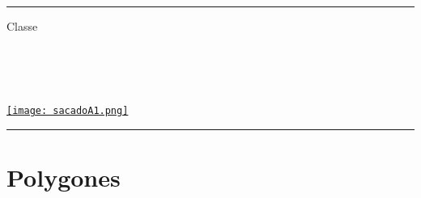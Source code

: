 \documentclass[a4paper,dvipsnames]{article}
\begin{document}

\fancyhead[C]{}
\hrule\medskip %
\begin{minipage}{0.295\textwidth} 
\raggedright
Classe \myClasse \hfill\\
\myDiscipline \hfill\\
\myParcours \hfill\\
\end{minipage}
\begin{minipage}{0.4\textwidth} 
\centering 
\scshape\huge
\textcolor{sacado_purple}{\myTitle} \\ 
\normalsize 
\end{minipage}
\begin{minipage}{0.295\textwidth} 
\raggedleft
\href{https://sacado.xyz/}{\texttt{[image: sacadoA1.png]}}
\end{minipage}
\medskip \hrule
\bigskip


%

\section{Polygones}
\end{document}
